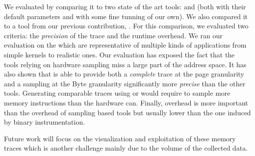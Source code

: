 We evaluated \Moca by comparing it to two state of the art tools: \Mitos and
\MemProf (both with their default parameters and with some fine tunning of our own). We also compared it to a
tool from our previous contribution, \TABARNAC. For this comparison, we evaluated
two criteria: the \emph{precision} of the trace and the runtime overhead. We ran our
evaluation on the \NPB which are representative of multiple kinds of applications from simple kernels
to realistic ones. Our evaluation has exposed the fact that the tools
relying on hardware sampling miss a large part of the address space. It
has also shown that \Moca is able to provide both a \emph{complete} trace at the page
granularity and a sampling at the Byte granularity significantly more \emph{precise} than the
other tools. Generating comparable traces using \MemProf or \Mitos would
require to sample more memory instructions than the hardware can.
Finally, \Moca overhead is more important than the overhead of sampling
based tools but usually lower than the one induced by binary instrumentation.

Future work will focus on the visualization and exploitation of these memory traces
which is another challenge mainly due to the volume of the collected data.
